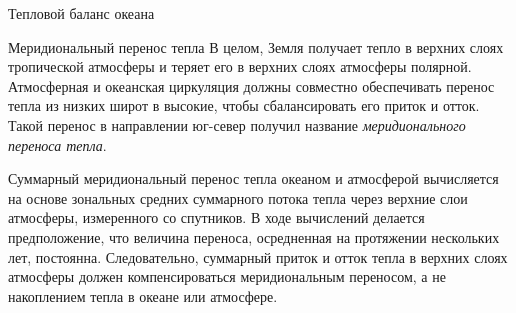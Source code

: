 \begin{chapter}{Тепловой баланс океана}
\begin{section}{Меридиональный перенос тепла}
В целом, Земля получает тепло в верхних слоях тропической атмосферы и теряет
его в верхних слоях атмосферы полярной. Атмосферная и океанская циркуляция
должны совместно обеспечивать перенос тепла из низких широт в высокие, чтобы
сбалансировать его приток и отток. Такой перенос в направлении юг-север
получил название \emph{меридионального переноса тепла}.
%

Суммарный меридиональный перенос тепла океаном и атмосферой вычисляется на
основе зональных средних суммарного потока тепла через верхние слои атмосферы,
измеренного со спутников. В ходе вычислений делается предположение, что
величина переноса, осредненная на протяжении нескольких лет, постоянна.
Следовательно, суммарный приток и отток тепла в верхних слоях атмосферы 
должен компенсироваться меридиональным переносом, а не накоплением тепла
в океане или атмосфере.
%


\end{section}
\end{chapter}
